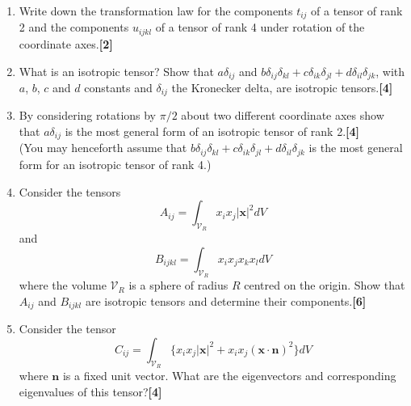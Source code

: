 \documentclass[a4paper]{article}
\begin{document}
\begin{qns}
\begin{enumerate}[label=(\roman*)]
\item Write down the transformation law for the components $t_{ij}$ of a tensor of rank 2 and the components $u_{ijkl}$ of a tensor of rank 4 under rotation of the coordinate axes.\hfill\textbf{[2]}
\item What is an isotropic tensor? Show that $a\delta_{ij}$ and $b\delta_{ij}\delta_{kl}+c\delta_{ik}\delta_{jl}+d\delta_{il}\delta_{jk}$, with $a$, $b$, $c$ and $d$ constants and $\delta_{ij}$ the Kronecker delta, are isotropic tensors.\hfill\textbf{[4]}
\item By considering rotations by $\pi/2$ about two different coordinate axes show that $a\delta_{ij}$ is the most general form of an isotropic tensor of rank 2.\hfill\textbf{[4]}\\[5pt]
(You may henceforth assume that $b\delta_{ij}\delta_{kl}+c\delta_{ik}\delta_{jl}+d\delta_{il}\delta_{jk}$ is the most general form for an isotropic tensor of rank 4.)
\item Consider the tensors
$$A_{ij}=\int_{\mathcal{V}_R}x_ix_j|\mathbf{x}|^2dV$$
and
$$B_{ijkl}=\int_{\mathcal{V}_R}x_ix_jx_kx_ldV$$
where the volume $\mathcal{V}_R$ is a sphere of radius $R$ centred on the origin. Show that $A_{ij}$ and $B_{ijkl}$ are isotropic tensors and determine their components.\hfill\textbf{[6]}
\item Consider the tensor
$$C_{ij}=\int_{\mathcal{V}_R}\{x_ix_j|\mathbf{x}|^2+x_ix_j(\mathbf{x}\cdot\mathbf{n})^2\}dV$$
where $\mathbf{n}$ is a fixed unit vector. What are the eigenvectors and corresponding eigenvalues of this tensor?\hfill\textbf{[4]}
\end{enumerate}
\end{qns}
\newpage
\end{document}
